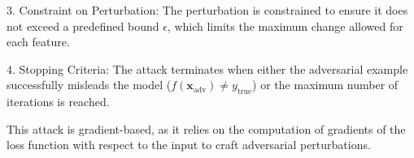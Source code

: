 3. Constraint on Perturbation: The perturbation is constrained to ensure it does not exceed a predefined bound $\epsilon$, which limits the maximum change allowed for each feature.

4. Stopping Criteria: The attack terminates when either the adversarial example successfully misleads the model ($f(\mathbf{x}_{\text{adv}}) \neq y_{\text{true}}$) or the maximum number of iterations is reached.

This attack is gradient-based, as it relies on the computation of gradients of the loss function with respect to the input to craft adversarial perturbations.